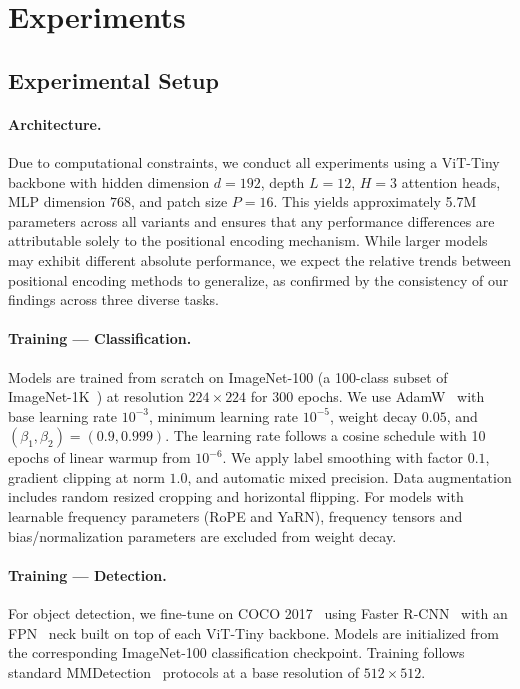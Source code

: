 \section{Experiments}
\label{sec:experiments}

\subsection{Experimental Setup}

\paragraph{Architecture.}
Due to computational constraints, we conduct all experiments using a ViT-Tiny backbone with hidden
dimension $d = 192$, depth $L = 12$, $H = 3$ attention heads, MLP dimension $768$, and patch size
$P = 16$. This yields approximately 5.7M parameters across all variants and ensures that any
performance differences are attributable solely to the positional encoding mechanism. While larger
models may exhibit different absolute performance, we expect the relative trends between positional
encoding methods to generalize, as confirmed by the consistency of our findings across three
diverse tasks.

\paragraph{Training --- Classification.}
Models are trained from scratch on ImageNet-100 (a 100-class subset of ImageNet-1K~\cite{deng2009imagenet}) at resolution
$224 \times 224$ for 300 epochs. We use AdamW~\cite{loshchilov2019decoupled} with base learning rate $10^{-3}$, minimum learning
rate $10^{-5}$, weight decay $0.05$, and $(\beta_1, \beta_2) = (0.9, 0.999)$. The learning rate
follows a cosine schedule with 10 epochs of linear warmup from $10^{-6}$. We apply label smoothing
with factor $0.1$, gradient clipping at norm $1.0$, and automatic mixed precision. Data
augmentation includes random resized cropping and horizontal flipping. For models with learnable
frequency parameters (RoPE and YaRN), frequency tensors and bias/normalization parameters are
excluded from weight decay.

\paragraph{Training --- Detection.}
For object detection, we fine-tune on COCO 2017~\cite{lin2014microsoft} using Faster R-CNN~\cite{ren2015faster} with an FPN~\cite{lin2017feature} neck built on top of
each ViT-Tiny backbone. Models are initialized from the corresponding ImageNet-100 classification
checkpoint. Training follows standard MMDetection~\cite{chen2019mmdetection} protocols at a base resolution of $512 \times 512$.

